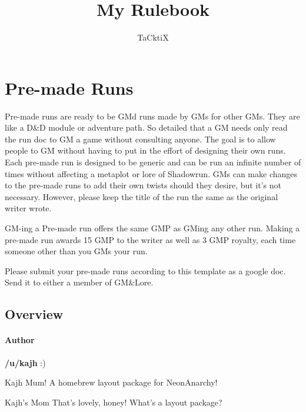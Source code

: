 \documentclass{ShadowTeXSR5}
\title{My Rulebook}
\author{TaCktiX}
\begin{document}
\srmaketitle[black]
\tableofcontents




\chapter{Pre-made Runs}

Pre-made runs are ready to be GMd runs made by GMs for other GMs. They are like a D\&D module or adventure path. So detailed that a GM needs only read the run doc to GM a game without consulting anyone. The goal is to allow people to GM without having to put in the effort of designing their own runs. Each pre-made run is designed to be generic and can be run an infinite number of times without affecting a metaplot or lore of Shadowrun. GMs can make changes to the pre-made runs to add their own twists should they desire, but it's not necessary. However, please keep the title of the run the same as the original writer wrote.

GM-ing a Pre-made run offers the same GMP as GMing any other run. Making a pre-made run awards 15 GMP to the writer as well as 3 GMP royalty, each time someone other than you GMs your run.

Please submit your pre-made runs according to this template as a google doc. Send it to either a member of GM\&Lore.


\section{Overview}
\subsubsection{Author}
\textbf{/u/kajh} :)\\

\begin{NAdeckercomment}{Kajh}
Mum! A homebrew layout package for NeonAnarchy!
\end{NAdeckercomment}
\begin{NAdeckercomment}{Kajh's Mom}
That's lovely, honey!  What's a layout package?
\end{NAdeckercomment}
\end{document}
